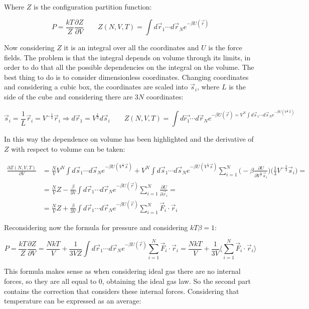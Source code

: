 	Where $Z$ is the configuration partition function:

	$$P = \frac{kT}{Z}\frac{\partial Z}{\partial V}\qquad Z(N, V, T) = \int d\vec{r}_1\cdots d\vec{r}_Ne^{-\beta U(\vec{r})}$$

	Now considering $Z$ it is an integral over all the coordinates and $U$ is the force fields.
	The problem is that the integral depends on volume through its limits, in order to do that all the possible dependencies on the integral on the volume.
	The best thing to do is to consider dimensionless coordinates.
	Changing coordinates and considering a cubic box, the coordinates are scaled into $\vec{s}_i$, where $L$ is the side of the cube and considering there are $3N$ coordinates:

	$$\vec{s}_i = \frac{1}{L}\vec{r}_i = V^{-\frac{1}{3}}\vec{r}_i \Rightarrow d\vec{r}_1 = V^{\frac{1}{3}}d\vec{s}_i\qquad Z(N, V, T) = \int d\vec{r_1}\cdots d\vec{r}_Ne^{-\beta U(\vec{r}) = V^N\int d\vec{s}_1\cdots d\vec{s}_Ne^{-\beta U(V^{\frac{1}{3}}\vec{s})}}$$

	In this way the dependence on volume has been highlighted and the derivative of $Z$ with respect to volume can be taken:

	\begin{align*}
		\frac{\partial Z(N, V, T)}{\partial V} &= \frac{N}{V}V^N\int d\vec{s}_1\cdots d\vec{s}_Ne^{-\beta U(V^{\frac{1}{3}}\vec{s})} + V^N\int d\vec{s}_1\cdots d\vec{s}_Ne^{-\beta U(V^{\frac{1}{3}}\vec{s})}\sum\limits_{i=1}^N\biggl(-\beta\frac{\partial U}{\partial V^{\frac{1}{3}}\vec{s}_i}\biggr)\biggl(\frac{1}{3}V^{-\frac{2}{3}}\vec{s}_i\biggr) = \\
																					 &=\frac{N}{V}Z - \frac{\beta}{3V}\int d\vec{r}_1\cdots d\vec{r}_Ne^{-\beta U(\vec{r})}\sum\limits_{i=1}^N\frac{\partial U}{\partial\vec{r}_i} =\\
																					 &=\frac{N}{V}Z + \frac{\beta}{3V}\int d\vec{r}_1\cdots d\vec{r}_Ne^{-\beta U(\vec{r})}\sum\limits_{i=1}^N\vec{F}_i\cdot\vec{r}_i
	\end{align*}

	Reconsidering now the formula for pressure and considering $kT\beta = 1$:

	$$P = \frac{kT}{Z}\frac{\partial Z}{\partial V} = \frac{NkT}{V} + \frac{1}{3VZ}\int d\vec{r}_1\cdots d\vec{r}_N e^{-\beta U(\vec{r})}\sum\limits_{i=1}^N\vec{F}_i\cdot\vec{r}_i = \frac{NkT}{V} + \frac{1}{3V}\biggl\langle\sum\limits_{i=1}^N\vec{F}_i\cdot\vec{r}_i\biggr\rangle$$

	This formula makes sense as when considering ideal gas there are no internal forces, so they are all equal to $0$, obtaining the ideal gas law.
	So the second part contains the correction that considers these internal forces.
	Considering that temperature can be expressed as an average:

